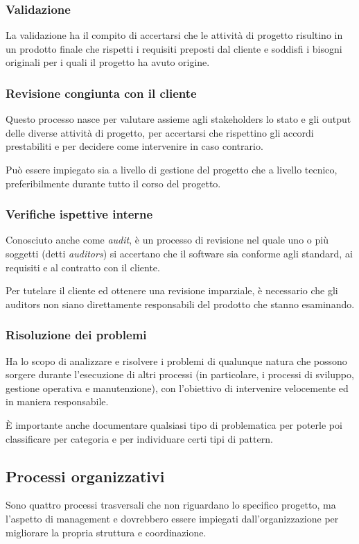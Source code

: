 \subsubsection{Validazione}
La validazione ha il compito di accertarsi che le attività di progetto risultino in un prodotto finale che rispetti i requisiti preposti dal cliente e soddisfi i bisogni originali per i quali il progetto ha avuto origine.
\subsubsection{Revisione congiunta con il cliente}
Questo processo nasce per valutare assieme agli stakeholders lo stato e gli output delle diverse attività di progetto, per accertarsi che rispettino gli accordi prestabiliti e per decidere come intervenire in caso contrario.
\par Può essere impiegato sia a livello di gestione del progetto che a livello tecnico, preferibilmente durante tutto il corso del progetto.
\subsubsection{Verifiche ispettive interne}
Conosciuto anche come \textit{audit}, è un processo di revisione nel quale uno o più soggetti (detti \textit{auditors}) si accertano che il software sia conforme agli standard, ai requisiti e al contratto con il cliente.
\par Per tutelare il cliente ed ottenere una revisione imparziale, è necessario che gli auditors non siano direttamente responsabili del prodotto che stanno esaminando.
\subsubsection{Risoluzione dei problemi}
Ha lo scopo di analizzare e risolvere i problemi di qualunque natura che possono sorgere durante l'esecuzione di altri processi (in particolare, i processi di sviluppo, gestione operativa e manutenzione), con l'obiettivo di intervenire velocemente ed in maniera responsabile.
\par È importante anche documentare qualsiasi tipo di problematica per poterle poi classificare per categoria e per individuare certi tipi di pattern.

\subsection{Processi organizzativi}
Sono quattro processi trasversali che non riguardano lo specifico progetto, ma l'aspetto di management e dovrebbero essere impiegati dall'organizzazione per migliorare la propria struttura e coordinazione.
